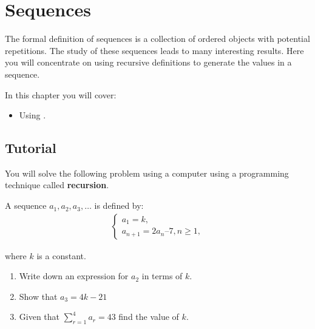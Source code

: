 \chapter{Sequences}
\label{chp:sequences}

The formal definition of sequences is a collection of ordered objects with
potential repetitions.
The study of these sequences leads to many interesting results. Here you will
concentrate on using recursive definitions to generate the values in a sequence.

\begin{note}
In this chapter you will cover:
\begin{itemize}
\item 

Using .

\end{itemize}
\end{note}




\section{Tutorial}
\label{\detokenize{tools-for-mathematics/07-sequences/tutorial/main:tutorial}}\label{\detokenize{tools-for-mathematics/07-sequences/tutorial/main::doc}}

You will solve the following problem using a computer using a programming
technique called \textbf{recursion}.

A sequence \(a_1, a_2, a_3, …\) is defined by:
\begin{equation*}
\begin{split}
    \left\{
    \begin{array}{l}
        a_1 = k,\\
        a_{n + 1} = 2a_n – 7, n \geq 1,
    \end{array}
    \right.
\end{split}
\end{equation*}

where \(k\) is a constant.
\begin{enumerate}

\item 

Write down an expression for \(a_2\) in terms of \(k\).

\item 

Show that \(a_3 = 4k -21\)

\item 

Given that \(\sum_{r=1}^4 a_r = 43\) find the value of \(k\).

\end{enumerate}



